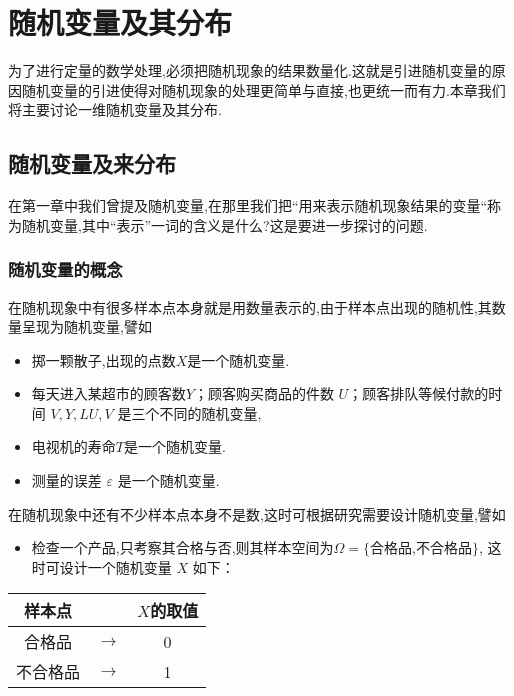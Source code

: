 \setcounter{chapter}{1}
\chapter{随机变量及其分布}

为了进行定量的数学处理,必须把随机现象的结果数量化.这就是引进随机变量的原因随机变量的引进使得对随机现象的处理更简单与直接,也更统一而有力.本章我们将主要讨论一维随机变量及其分布.

\section{随机变量及来分布}

在第一章中我们曾提及随机变量,在那里我们把“用来表示随机现象结果的变量“称为随机变量,其中“表示”一词的含义是什么?这是要进一步探讨的问题.

\subsection{随机变量的概念}

在随机现象中有很多样本点本身就是用数量表示的,由于样本点出现的随机性,其数量呈现为随机变量,譬如

\begin{itemize}
	\item 掷一颗散子,出现的点数$X$是一个随机变量.
	\item 每天进入某超市的顾客数$Y$；顾客购买商品的件数 $U$；顾客排队等候付款的时间 $V,Y,LU,V$ 是三个不同的随机变量,
	\item 电视机的寿命$T$是一个随机变量.
	\item 测量的误差 $\varepsilon $ 是一个随机变量.
\end{itemize}

在随机现象中还有不少样本点本身不是数,这时可根据研究需要设计随机变量,譬如
\begin{itemize}
	\item 检查一个产品,只考察其合格与否,则其样本空间为$\Omega=\{$合格品,不合格品$\}$, 这时可设计一个随机变量 $X$ 如下：
\end{itemize}

\begin{table}[htbp]
	\centering
	\begin{tabular}{ccc}
		样本点   &       & $X$的取值 \\\hline
		合格品   &   $ \longrightarrow $ & 0 \\
		不合格品 &    $ \longrightarrow $ & 1 \\
	\end{tabular}%
\end{table}%

